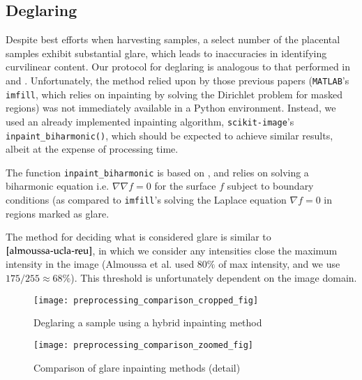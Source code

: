 		    \subsection{Deglaring}
    
    Despite best efforts when harvesting samples, a select number of the placental samples exhibit substantial glare, which leads to inaccuracies in identifying curvilinear content. Our protocol for deglaring is analogous to that performed in \cite{almoussa-ucla-reu} and \cite{huynh2013filter}. Unfortunately, the method relied upon by those previous papers (\texttt{MATLAB}'s \texttt{imfill}, which relies on inpainting by solving the Dirichlet problem for masked regions) was not immediately available in a Python environment. Instead, we used an already implemented inpainting algorithm, \texttt{scikit-image}'s \texttt{inpaint\_biharmonic()}, which should be expected to achieve similar results, albeit at the expense of processing time.
    
    The function \texttt{inpaint\_biharmonic} is based on \cite{damelin2018surface}, and relies on solving a
    biharmonic equation i.e. $\nabla \nabla f = 0$ for the surface $f$ subject to boundary conditions (as
    compared to \texttt{imfill}'s solving the Laplace equation $\nabla f = 0$ in regions marked as glare.
    
    The method for deciding what is considered glare is similar to $\cite{almoussa-ucla-reu}$, in which we
    consider any intensities close the maximum intensity in the image (Almoussa et al. used $80\%$ of max intensity, and we use $175/255 \approx 68\%$). This threshold is unfortunately dependent on the image domain.
    
        \begin{figure} 
        \texttt{[image: preprocessing\_comparison\_cropped\_fig]}
        \caption{Deglaring a sample using a hybrid inpainting method}
        \label{fig:glare-example-crop}
        \end{figure}

        \begin{figure}[t] \centering
        \texttt{[image: preprocessing\_comparison\_zoomed\_fig]}
        \caption{Comparison of glare inpainting methods (detail)}
        \label{fig:glare-example-zoom}
        \end{figure}
    
